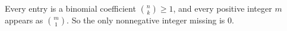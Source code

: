 Every entry is a binomial coefficient $\binom nk\ge1$, and every positive integer $m$ appears as $\binom m1$. So the only nonnegative integer missing is $\boxed{0}$.
